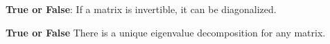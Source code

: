 \begin{enumerate}
  \qitem \textbf{True or False}: If a matrix is invertible, it can be diagonalized. \\




  \qitem \textbf{True or False} There is a unique eigenvalue decomposition for any matrix. \\




\end{enumerate}
